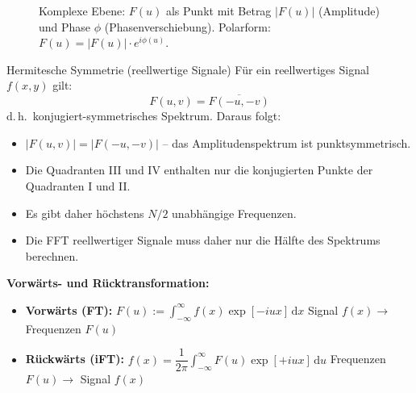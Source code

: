 \documentclass[12pt, a4paper]{article}
\begin{document}
\begin{figure}[H]
\centering
{}
\caption{Komplexe Ebene: $F(u)$ als Punkt mit Betrag $|F(u)|$
(Amplitude) und Phase $\phi$ (Phasenverschiebung).
Polarform: $F(u) = |F(u)|\cdot e^{i\phi(u)}$.}
\end{figure}

\begin{notebox}{Hermitesche Symmetrie (reellwertige Signale)}
Für ein reellwertiges Signal $f(x,y)$ gilt:
\[
  F(u,v) = \overline{F(-u,-v)}
\]
d.\,h.\ konjugiert-symmetrisches Spektrum. Daraus folgt:
\begin{itemize}
  \item $|F(u,v)| = |F(-u,-v)|$ -- das Amplitudenspektrum ist punktsymmetrisch.
  \item Die Quadranten III und IV enthalten nur die konjugierten Punkte der Quadranten I und II.
  \item Es gibt daher höchstens $N/2$ unabhängige Frequenzen.
  \item Die FFT reellwertiger Signale muss daher nur die Hälfte des Spektrums berechnen.
\end{itemize}
\end{notebox}

\textbf{Vorwärts- und Rücktransformation:}
\begin{itemize}
  \item \textbf{Vorwärts (FT):}
        $F(u) := \displaystyle\int_{-\infty}^{\infty}
        f(x)\exp[-iux]\,\mathrm{d}x$
        \hfill Signal $f(x) \to$ Frequenzen $F(u)$
  \item \textbf{Rückwärts (iFT):}
        $f(x) = \dfrac{1}{2\pi}\displaystyle\int_{-\infty}^{\infty}
        F(u)\exp[+iux]\,\mathrm{d}u$
        \hfill Frequenzen $F(u) \to$ Signal $f(x)$
\end{itemize}
\end{document}
